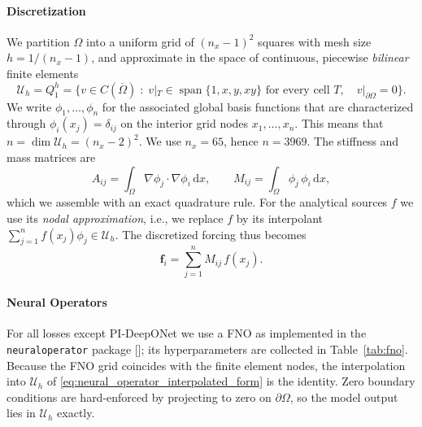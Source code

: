 \documentclass{article} %
\begin{document}
\paragraph{Discretization} We partition $\Omega$ into a uniform grid of $(n_x-1)^2$ squares with mesh size $h = 1/(n_x-1)$, and approximate in the space of continuous, piecewise \emph{bilinear} finite elements
\begin{equation*}
   \mathcal U_h = Q_1^h = \big\{ v \in C(\overline\Omega) \;:\; v|_T \in \operatorname{span}\{1, x, y, xy\} \text{ for every cell } T, \quad v|_{\partial\Omega} = 0 \big\}.
\end{equation*}
We write $\phi_1, \dots, \phi_n$ for the associated global basis functions that are characterized through $\phi_i(x_j) = \delta_{ij}$ on the interior grid nodes $x_1, \dots, x_n$. This means that $n = \dim \mathcal U_h = (n_x-2)^2$. We use $n_x = 65$, hence $n = 3969$. The stiffness and mass matrices are
\begin{equation}\label{eq:appendix_stiffness_mass}
   A_{ij} = \int_\Omega \nabla\phi_j \cdot \nabla\phi_i \,\mathrm dx,
   \qquad
   M_{ij} = \int_\Omega \phi_j\,\phi_i \,\mathrm dx,
\end{equation}
which we assemble with an exact quadrature rule. For the analytical sources $f$ we use its \emph{nodal approximation}, i.e., we replace $f$ by its interpolant $\sum_{j=1}^n f(x_j)\phi_j \in \mathcal U_h$. The discretized forcing thus becomes
\begin{equation}\label{eq:appendix_consistent_rhs}
   \mathbf f_i = \sum_{j=1}^n M_{ij}\,f(x_j).
\end{equation}

\paragraph{Neural Operators} For all losses except PI-DeepONet we use a FNO as implemented in the \texttt{neuraloperator} package []; its hyperparameters are collected in Table~\ref{tab:fno}. Because the FNO grid coincides with the finite element nodes, the interpolation into $\mathcal U_h$ of \eqref{eq:neural_operator_interpolated_form} is the identity. Zero boundary conditions are hard-enforced by projecting to zero on $\partial\Omega$, so the model output lies in $\mathcal U_h$ exactly.
\end{document}
